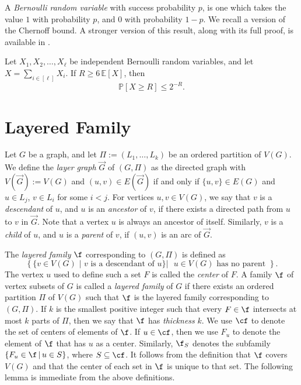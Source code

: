 A \emph{Bernoulli random variable} with success probability $p$, is one which takes the value $1$ with probability $p$, and $0$ with probability $1-p$. 
We recall a version of the Chernoff bound. A stronger version of this result, along with its full proof, is available in \cite{mitzenmacher2017probability}.

\begin{proposition}\label{thm:chernoff}
    Let $X_1, X_2, \dots, X_\ell$ be independent Bernoulli random variables, and let $X = \sum_{i \in [\ell]} X_i$. If $R \geq 6\,\mathbb{E}[X]$, then
    $$
    \mathbb{P}[X \geq R] \leq 2^{-R}.
    $$
\end{proposition}

\section{Layered Family}


Let $G$ be a graph, and let $\Pi := (L_1,\dots,L_k)$ be an ordered partition of $V(G)$. We define the \emph{layer graph} $\vec{G}$ of $(G,\Pi)$ as the directed graph with $V(\vec{G}) := V(G)$ and $(u,v) \in E(\vec{G})$ if and only if $\{u,v\} \in E(G)$ and $u \in L_j$, $v \in L_i$ for some $i<j$. For vertices $u,v \in V(G)$, we say that $v$ is a \emph{descendant} of $u$, and $u$ is an \emph{ancestor} of $v$, if there exists a directed path from $u$ to $v$ in $\vec{G}$. Note that a vertex $u$ is always an ancestor of itself. Similarly, $v$ is a \emph{child} of $u$, and $u$ is a \emph{parent} of $v$, if $(u,v)$ is an arc of $\vec{G}$. 

The \emph{layered family} $\f$ corresponding to $(G,\Pi)$ is defined as 
\[\left\{\{v\in V(G) \text{ | $v$ is a descendant of $u$}\}\big| \text{ $u\in V(G)$ has no parent }\right\}.\] The vertex $u$ used to define such a set $F$ is called the \emph{center} of $F$.
%
A family $\f$ of vertex subsets of $G$ is called a \emph{layered family} of $G$ if there exists an ordered partition $\Pi$ of $V(G)$ such that $\f$ is the layered family corresponding to $(G,\Pi)$. If $k$ is the smallest positive integer such that every $F\in\f$ intersects at most $k$ parts of $\Pi$, then we say that $\f$ has \emph{thickness} $k$.
% 
% 
We use $\cf$ to denote the set of centers of elements of $\f$. If $u\in \cf$, then we use $F_u$ to denote the element of $\f$ that has $u$ as a center. Similarly, $\f_S$ denotes the subfamily $\{F_u \in \f\,|\, u\in S\}$, where $S\subseteq \cf$. It follows from the definition that $\f$ covers $V(G)$ and that the center of each set in $\f$ is unique to that set. The following lemma is immediate from the above definitions.

